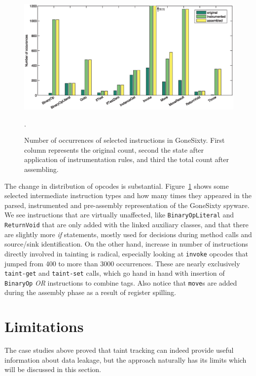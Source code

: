\documentclass[12pt,twoside,notitlepage]{report}
\begin{document}
\begin{figure}
	\centerline{	
		\includegraphics[width=\textwidth]{figs/fig_eval_codebloat.eps}
	}
	\caption{Number of occurrences of selected instructions in GoneSixty. First column represents the original count, second the state after application of instrumentation rules, and third the total count after assembling.}.
	\label{figure:Evalutaion_CodeBloat}
\end{figure}

The change in distribution of opcodes is substantial. Figure~\ref{figure:Evalutaion_CodeBloat} shows some selected intermediate instruction types and how many times they appeared in the parsed, instrumented and pre-assembly representation of the GoneSixty spyware. We see instructions that are virtually unaffected, like \verb$BinaryOpLiteral$ and \verb$ReturnVoid$ that are only added with the linked auxiliary classes, and that there are slightly more \emph{if} statements, mostly used for decisions during method calls and source/sink identification. On the other hand, increase in number of instructions directly involved in tainting is radical, especially looking at \verb$invoke$ opcodes that jumped from 400 to more than 3000 occurrences. These are nearly exclusively \verb$taint-get$ and \verb$taint-set$ calls, which go hand in hand with insertion of \verb$BinaryOp$ \emph{OR} instructions to combine tags. Also notice that \verb$move$s are added during the assembly phase as a result of register spilling.

\section{Limitations}

The case studies above proved that taint tracking can indeed provide useful information about data leakage, but the approach naturally has its limits which will be discussed in this section. 
\end{document}
